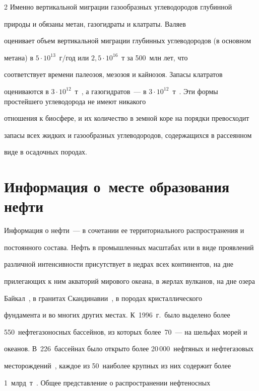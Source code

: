 \begin{multicols}{2}
     Именно вертикальной миграции газообразных углеводородов глубинной 

природы и обязаны метан, газогидраты и клатраты. Валяев~\cite{6s} 

оценивает объем вертикальной миграции глубинных углеводородов (в основном 

метана) в $5\cdot 10^{13}$~г/год или $2{,}5\cdot 10^{16}$~т за 500~млн лет, что 

соответствует времени палеозоя, мезозоя и кайнозоя. Запасы клатратов 

оцениваются в $3\cdot 10^{12}$~т~\cite{17s}, а газогидратов~--- в $3\cdot

10^{12}$~т~\cite{26s}. Эти формы простейшего углеводорода не имеют никакого 

отношения к биосфере, и их количество в земной коре на порядки превосходит 

запасы всех жидких и газообразных углеводородов, содержащихся в рассеянном 

виде в осадочных породах.

     

\section{Информация о~месте образования нефти}



     Информация о нефти~--- в сочетании ее территориального распространения и 

постоянного состава. Нефть в промышленных масштабах или в виде проявлений 

различной интенсивности присутствует в недрах всех континентов, на дне 

прилегающих к ним акваторий мирового океана, в жерлах вулканов, на дне озера 

Байкал~\cite{2s}, в гранитах Скандинавии~\cite{30s}, в породах кристаллического 

фундамента и во многих других местах. К~1996~г.\ было выделено более 

550~нефтегазоносных бассейнов, из которых более~70~--- на шельфах морей и 

океанов. В~226~бассейнах было открыто более 20\,000~нефтяных и нефтегазовых 

месторождений~\cite{15s}, каждое из 50~наиболее крупных из них содержит более 

1~млрд~т~\cite{11s}. Общее представление о распространении нефтеносных 


\end{multicols}
